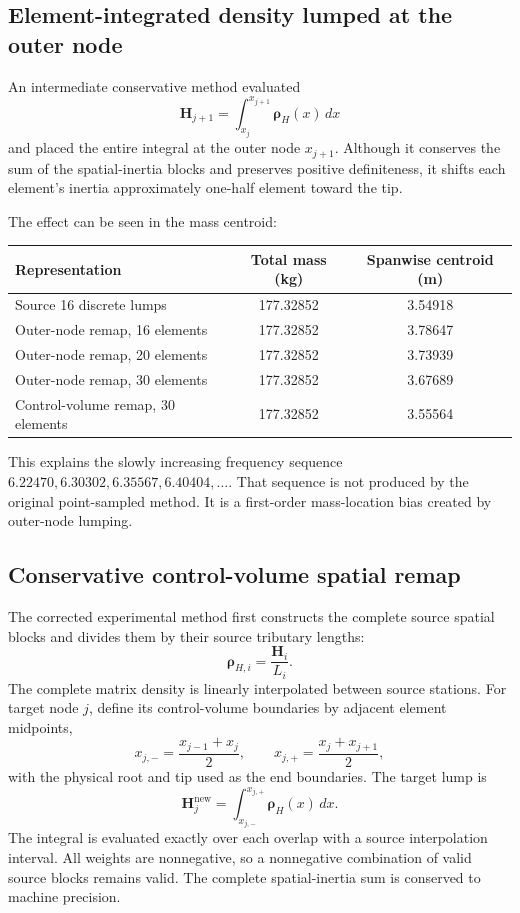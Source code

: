 \documentclass[11pt,a4paper]{article}
\newcommand{\mat}[1]{\bm{#1}}
\begin{document}
\subsection{Element-integrated density lumped at the outer node}

An intermediate conservative method evaluated
\begin{equation}
\mat H_{j+1}=\int_{x_j}^{x_{j+1}}\mat\rho_H(x)\,dx
\end{equation}
and placed the entire integral at the outer node \(x_{j+1}\).  Although it
conserves the sum of the spatial-inertia blocks and preserves positive
definiteness, it shifts each element's inertia approximately one-half element
toward the tip.

The effect can be seen in the mass centroid:
\begin{center}
\begin{tabular}{lcc}
\toprule
Representation & Total mass (kg) & Spanwise centroid (m)\\
\midrule
Source 16 discrete lumps & 177.32852 & 3.54918\\
Outer-node remap, 16 elements & 177.32852 & 3.78647\\
Outer-node remap, 20 elements & 177.32852 & 3.73939\\
Outer-node remap, 30 elements & 177.32852 & 3.67689\\
Control-volume remap, 30 elements & 177.32852 & 3.55564\\
\bottomrule
\end{tabular}
\end{center}

This explains the slowly increasing frequency sequence
\(6.22470, 6.30302, 6.35567, 6.40404,\ldots\).  That sequence is not produced
by the original point-sampled method.  It is a first-order mass-location bias
created by outer-node lumping.

\subsection{Conservative control-volume spatial remap}

The corrected experimental method first constructs the complete source
spatial blocks and divides them by their source tributary lengths:
\begin{equation}
\mat\rho_{H,i}=\frac{\mat H_i}{L_i}.
\end{equation}
The complete matrix density is linearly interpolated between source stations.
For target node \(j\), define its control-volume boundaries by adjacent
element midpoints,
\begin{equation}
x_{j,-}=\frac{x_{j-1}+x_j}{2}, \qquad
x_{j,+}=\frac{x_j+x_{j+1}}{2},
\end{equation}
with the physical root and tip used as the end boundaries.  The target lump
is
\begin{equation}
\mat H_j^{\mathrm{new}} =
\int_{x_{j,-}}^{x_{j,+}}\mat\rho_H(x)\,dx.
\end{equation}
The integral is evaluated exactly over each overlap with a source interpolation
interval.  All weights are nonnegative, so a nonnegative combination of
valid source blocks remains valid.  The complete spatial-inertia sum is
conserved to machine precision.
\end{document}
